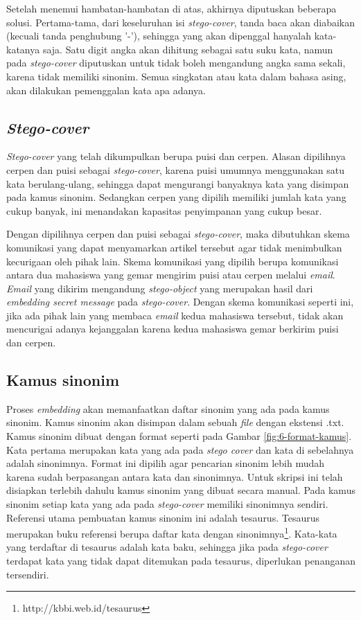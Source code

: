 Setelah menemui hambatan-hambatan di atas, akhirnya diputuskan beberapa solusi. Pertama-tama, dari keseluruhan isi \textit{stego-cover}, tanda baca akan diabaikan (kecuali tanda penghubung '-'), sehingga yang akan dipenggal hanyalah kata-katanya saja. Satu digit angka akan dihitung sebagai satu suku kata, namun pada \textit{stego-cover} diputuskan untuk tidak boleh mengandung angka sama sekali, karena tidak memiliki sinonim. Semua singkatan atau kata dalam bahasa asing, akan dilakukan pemenggalan kata apa adanya.

\subsection{\textit{Stego-cover}}
\textit{Stego-cover} yang telah dikumpulkan berupa puisi dan cerpen. Alasan dipilihnya cerpen dan puisi sebagai \textit{stego-cover}, karena puisi umumnya menggunakan satu kata berulang-ulang, sehingga dapat mengurangi banyaknya kata yang disimpan pada kamus sinonim. Sedangkan cerpen yang dipilih memiliki jumlah kata yang cukup banyak, ini menandakan kapasitas penyimpanan yang cukup besar.

Dengan dipilihnya cerpen dan puisi sebagai \textit{stego-cover}, maka dibutuhkan skema komunikasi yang dapat menyamarkan artikel tersebut agar tidak menimbulkan kecurigaan oleh pihak lain. Skema komunikasi yang dipilih berupa komunikasi antara dua mahasiswa yang gemar mengirim puisi atau cerpen melalui \textit{email}. \textit{Email} yang dikirim mengandung \textit{stego-object} yang merupakan hasil dari \textit{embedding secret message} pada \textit{stego-cover}. Dengan skema komunikasi seperti ini, jika ada pihak lain yang membaca \textit{email} kedua mahasiswa tersebut, tidak akan mencurigai adanya kejanggalan karena kedua mahasiswa gemar berkirim puisi dan cerpen.

\subsection{Kamus sinonim}
\label{sec:kamus_sinonim}
Proses \textit{embedding} akan memanfaatkan daftar sinonim yang ada pada kamus sinonim. Kamus sinonim akan disimpan dalam sebuah \textit{file} dengan ekstensi .txt. Kamus sinonim dibuat dengan format seperti pada Gambar \ref{fig:6-format-kamus}. Kata pertama merupakan kata yang ada pada \textit{stego cover} dan kata di sebelahnya adalah sinonimnya. Format ini dipilih agar pencarian sinonim lebih mudah karena sudah berpasangan antara kata dan sinonimnya. Untuk skripsi ini telah disiapkan terlebih dahulu kamus sinonim yang dibuat secara manual. Pada kamus sinonim setiap kata yang ada pada \textit{stego-cover} memiliki sinonimnya sendiri. Referensi utama pembuatan kamus sinonim ini adalah tesaurus. Tesaurus merupakan buku referensi berupa daftar kata dengan sinonimnya\footnote{http://kbbi.web.id/tesaurus}. Kata-kata yang terdaftar di tesaurus adalah kata baku, sehingga jika pada \textit{stego-cover} terdapat kata yang tidak dapat ditemukan pada tesaurus, diperlukan penanganan tersendiri.

